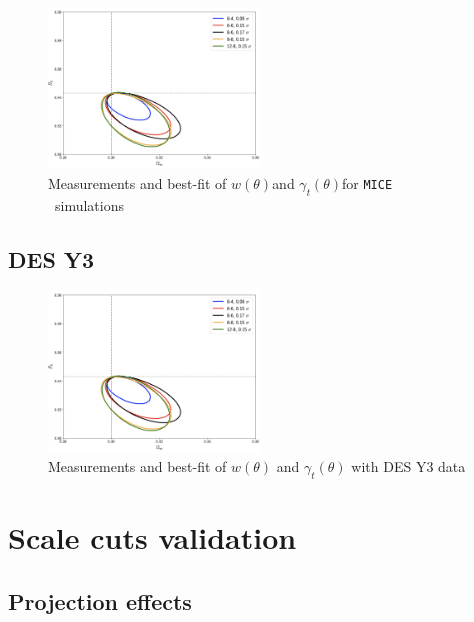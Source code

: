 \documentclass[fleqn,usenatbib]{mnras}
\newcommand{\gammat}{\ensuremath{\gamma_{t}(\theta)}}
\newcommand{\wtheta}{\ensuremath{w(\theta)}}
\newcommand{\mice}{\texttt{MICE} }
\begin{document}
\begin{figure}
\includegraphics[width=0.5\textwidth,draft]{figs/temp.png}
\caption[]{Measurements and best-fit of \wtheta and \gammat for \mice \  simulations }
\label{fig:mice_2pt}
\end{figure}

\subsection{DES Y3}
\begin{figure}
\includegraphics[width=0.5\textwidth,draft]{figs/temp.png}
\caption[]{Measurements and best-fit of $\wtheta$ and $\gammat$ with DES Y3 data }
\label{fig:data_2pt}
\end{figure}

\section{Scale cuts validation}\label{app:scale_cuts}
\subsection{Projection effects}\label{app:projection_effects}

\end{document}
